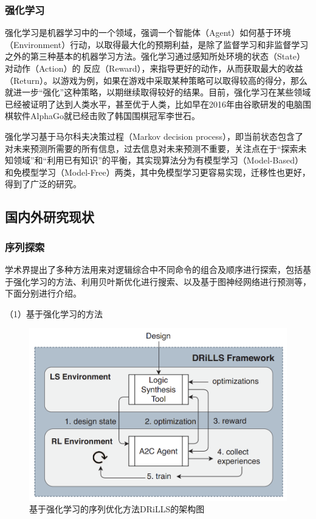 \subsubsection{强化学习}

强化学习是机器学习中的一个领域，强调一个智能体（Agent）如何基于环境（Environment）行动，以取得最大化的预期利益，是除了监督学习和非监督学习之外的第三种基本的机器学习方法。强化学习通过感知所处环境的状态（State）对动作（Action）的 反应（Reward），来指导更好的动作，从而获取最大的收益（Return）。以游戏为例，如果在游戏中采取某种策略可以取得较高的得分，那么就进一步“强化”这种策略，以期继续取得较好的结果。目前，强化学习在某些领域已经被证明了达到人类水平，甚至优于人类，比如早在2016年由谷歌研发的电脑围棋软件AlphaGo\cite{AI:AlphaGo}就已经击败了韩国围棋冠军李世石。

强化学习基于马尔科夫决策过程（Markov decision process），即当前状态包含了对未来预测所需要的所有信息，过去信息对未来预测不重要，关注点在于“探索未知领域”和“利用已有知识”的平衡，其实现算法分为有模型学习（Model-Based）和免模型学习（Model-Free）两类，其中免模型学习更容易实现，迁移性也更好，得到了广泛的研究。

\subsection{国内外研究现状}

\subsubsection{序列探索}

学术界提出了多种方法用来对逻辑综合中不同命令的组合及顺序进行探索，包括基于强化学习的方法、利用贝叶斯优化进行搜索、以及基于图神经网络进行预测等，下面分别进行介绍。

（1）基于强化学习的方法

\begin{figure}[!htbp]
    \centering
    \includegraphics[width=0.7\linewidth]{./figs/LS-DRiLLS-framework.png}
    \caption{基于强化学习的序列优化方法DRiLLS的架构图}
    \label{LS:DRiLLS:Fig:framework}
\end{figure}

